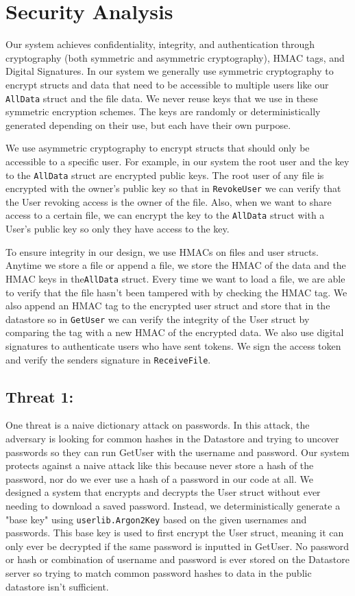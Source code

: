 \documentclass{article}
\begin{document}
\section{Security Analysis}

Our system achieves confidentiality, integrity, and authentication through cryptography (both symmetric and asymmetric cryptography), HMAC tags, and Digital Signatures. In our system we generally use symmetric cryptography to encrypt structs and data that need to be accessible to multiple users like our \texttt{AllData} struct and the file data. We never reuse keys that we use in these symmetric encryption schemes. The keys are randomly or deterministically generated depending on their use, but each have their own purpose.

We use asymmetric cryptography to encrypt structs that should only be accessible to a specific user. For example, in our system the root user and the key to the \texttt{AllData} struct are encrypted public keys. The root user of any file is encrypted with the owner's public key so that in \texttt{RevokeUser} we can verify that the User revoking access is the owner of the file. Also, when we want to share access to a certain file, we can encrypt the key to the \texttt{AllData} struct with a User's public key so only they have access to the key.

To ensure integrity in our design, we use HMACs on files and user structs. Anytime we store a file or append a file, we store the HMAC of the data and the HMAC keys in the\texttt{AllData} struct. Every time we want to load a file, we are able to verify that the file hasn't been tampered with by checking the HMAC tag. We also append an HMAC tag to the encrypted user struct and store that in the datastore so in \texttt{GetUser} we can verify the integrity of the User struct by comparing the tag with a new HMAC of the encrypted data. We also use digital signatures to authenticate users who have sent tokens. We sign the access token and verify the senders signature in \texttt{ReceiveFile}.

\subsection{Threat 1: } %
One threat is a naive dictionary attack on passwords. In this attack, the adversary is looking for common hashes in the Datastore and trying to uncover passwords so they can run GetUser with the username and password. Our system protects against a naive attack like this because never store a hash of the password, nor do we ever use a hash of a password in our code at all. We designed a system that encrypts and decrypts the User struct without ever needing to download a saved password. Instead, we deterministically generate a "base key"  using \texttt{userlib.Argon2Key} based on the given usernames and passwords. This base key is used to first encrypt the User struct, meaning it can only ever be decrypted if the same password is inputted in GetUser. No password or hash or combination of username and password is ever stored on the Datastore server so trying to match common password hashes to data in the public datastore isn't sufficient. 
\end{document}
